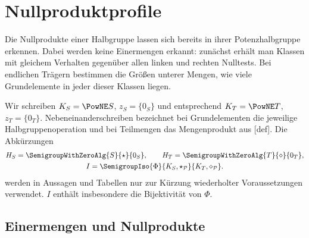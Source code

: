 \chapter{Nullproduktprofile}

Die Nullprodukte einer Halbgruppe lassen sich bereits in ihrer
Potenzhalbgruppe erkennen. Dabei werden keine Einermengen erkannt:
zunächst erhält man Klassen mit gleichem Verhalten gegenüber allen
linken und rechten Nulltests. Bei endlichen Trägern bestimmen die Größen
unterer Mengen, wie viele Grundelemente in jeder dieser Klassen liegen.

Wir schreiben \(K_S=\PowNE S\), \(z_S=\{0_S\}\) und entsprechend
\(K_T=\PowNE T\), \(z_T=\{0_T\}\). Nebeneinanderschreiben bezeichnet
bei Grundelementen die jeweilige Halbgruppenoperation und bei Teilmengen
das Mengenprodukt aus [def].
Die Abkürzungen
\[
 \begin{gathered}
 H_S=\SemigroupWithZeroAlg{S}{\star}{0_S},\qquad
 H_T=\SemigroupWithZeroAlg{T}{\diamond}{0_T},\\
 I=\SemigroupIso{\Phi}{K_S,\star_{\mathcal P}}{K_T,\diamond_{\mathcal P}}.
 \end{gathered}
\]
werden in Aussagen und Tabellen nur zur Kürzung wiederholter
Voraussetzungen verwendet. \(I\) enthält insbesondere die Bijektivität
von \(\Phi\).

\section{Einermengen und Nullprodukte}

\begin{tabproof}
\end{tabproof}

